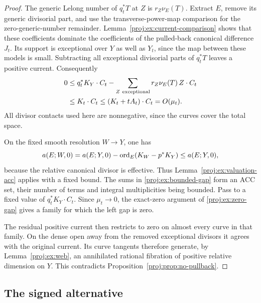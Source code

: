 \begin{proof}
The generic Lelong number of \(q_t^*T\) at \(Z\) is
\(r_Z\nu_E(T)\). Extract \(E\), remove its generic
divisorial part, and use the transverse-power-map
comparison for the zero-generic-number remainder.
Lemma~\ref{proj:ex:current-comparison} shows that these
coefficients dominate the coefficients of the pulled-back
canonical difference \(J_t\). Its support is exceptional
over \(Y\) as well as \(Y_t\), since the map between these
models is small. Subtracting all exceptional divisorial
parts of \(q_t^*T\) leaves a positive current. Consequently
\begin{equation}\label{proj:ex:bounded-gap}
 \begin{split}
 0&\leq q_t^*K_Y\cdot C_t
       -\sum_{Z\ {\rm exceptional}}
                r_Z\nu_E(T)\,Z\cdot C_t\\
  &\leq K_t\cdot C_t
   \leq (K_t+tA_t)\cdot C_t
   =O(\mu_t).
 \end{split}
\end{equation}
All divisor contacts used here are nonnegative, since the
curves cover the total space.

On the fixed smooth resolution \(W\to Y\), one has
\[
 a(E;W,0)=a(E;Y,0)
       -\operatorname{ord}_E(K_W-p^*K_Y)\leq a(E;Y,0),
\]
because the relative canonical divisor is effective.
Thus Lemma~\ref{proj:ex:valuation-acc} applies with a fixed
bound. The sums in \eqref{proj:ex:bounded-gap} form an ACC
set, their number of terms and integral multiplicities
being bounded. Pass to a fixed value of
\(q_t^*K_Y\cdot C_t\). Since \(\mu_t\to0\), the
exact-zero argument of \eqref{proj:ex:zero-gap} gives a family
for which the left gap is zero.

The residual positive current then restricts to zero on
almost every curve in that family. On the dense open
away from the removed exceptional divisors it agrees
with the original current. Its curve tangents therefore
generate, by Lemma~\ref{proj:ex:web}, an annihilated rational
fibration of positive relative dimension on \(Y\).
This contradicts Proposition~\ref{proj:prop:no-pullback}.
\end{proof}

\subsection{The signed alternative}

